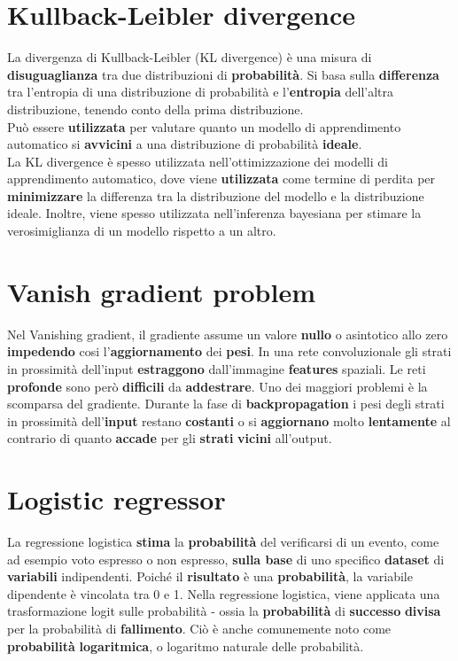 \documentclass{article}
\begin{document}
\section{Kullback-Leibler divergence}
La divergenza di Kullback-Leibler (KL divergence) è una misura di \textbf{disuguaglianza} tra due distribuzioni di \textbf{probabilità}. Si basa sulla \textbf{differenza} tra l'entropia di una distribuzione di probabilità e l'\textbf{entropia} dell'altra distribuzione, tenendo conto della prima distribuzione.\\
 Può essere \textbf{utilizzata} per valutare quanto un modello di apprendimento automatico si \textbf{avvicini} a una distribuzione di probabilità \textbf{ideale}.\\
 La KL divergence è spesso utilizzata nell'ottimizzazione dei modelli di apprendimento automatico, dove viene \textbf{utilizzata} come termine di perdita per \textbf{minimizzare} la differenza tra la distribuzione del modello e la distribuzione ideale. Inoltre, viene spesso utilizzata nell'inferenza bayesiana per stimare la verosimiglianza di un modello rispetto a un altro.
 

\section{Vanish gradient problem}
Nel Vanishing gradient, il gradiente assume un valore \textbf{nullo} o asintotico allo zero \textbf{impedendo} cosi l’\textbf{aggiornamento} dei \textbf{pesi}. In una rete convoluzionale gli strati in prossimità dell’input \textbf{estraggono} dall'immagine \textbf{features} spaziali. Le reti \textbf{profonde} sono però \textbf{difficili} da \textbf{addestrare}. Uno dei maggiori problemi è la scomparsa del gradiente. Durante la fase di \textbf{backpropagation} i pesi degli strati in prossimità dell’\textbf{input} restano \textbf{costanti} o si \textbf{aggiornano} molto \textbf{lentamente} al contrario di quanto \textbf{accade} per gli \textbf{strati} \textbf{vicini} all’output.

\section{Logistic regressor}
La regressione logistica \textbf{stima} la \textbf{probabilità} del verificarsi di un evento, come ad esempio voto espresso o non espresso, \textbf{sulla base} di uno specifico \textbf{dataset} di \textbf{variabili} indipendenti. Poiché il \textbf{risultato} è una \textbf{probabilità}, la variabile dipendente è vincolata tra 0 e 1. Nella regressione logistica, viene applicata una trasformazione logit sulle probabilità - ossia la \textbf{probabilità} di \textbf{successo} \textbf{divisa} per la probabilità di \textbf{fallimento}. Ciò è anche comunemente noto come \textbf{probabilità} \textbf{logaritmica}, o logaritmo naturale delle probabilità.
\end{document}
